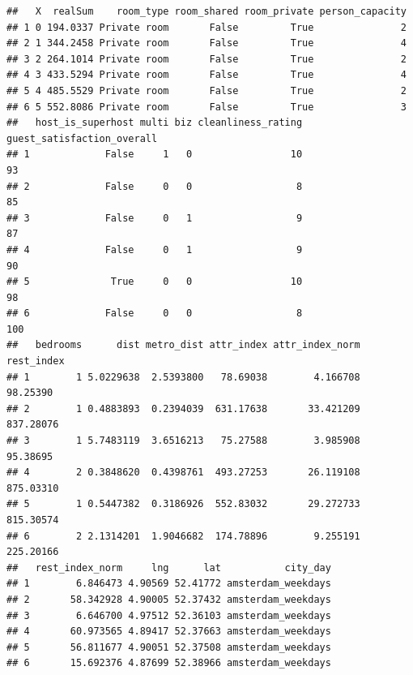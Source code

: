 \documentclass[
]{article}
\newenvironment{Shaded}{\begin{snugshade}}{\end{snugshade}}
\newcommand{\CommentTok}[1]{\textcolor[rgb]{0.56,0.35,0.01}{\textit{#1}}}
\newcommand{\FunctionTok}[1]{\textcolor[rgb]{0.00,0.00,0.00}{#1}}
\newcommand{\NormalTok}[1]{#1}
\newcommand{\SpecialCharTok}[1]{\textcolor[rgb]{0.00,0.00,0.00}{#1}}
\begin{document}
\begin{verbatim}
##   X  realSum    room_type room_shared room_private person_capacity
## 1 0 194.0337 Private room       False         True               2
## 2 1 344.2458 Private room       False         True               4
## 3 2 264.1014 Private room       False         True               2
## 4 3 433.5294 Private room       False         True               4
## 5 4 485.5529 Private room       False         True               2
## 6 5 552.8086 Private room       False         True               3
##   host_is_superhost multi biz cleanliness_rating guest_satisfaction_overall
## 1             False     1   0                 10                         93
## 2             False     0   0                  8                         85
## 3             False     0   1                  9                         87
## 4             False     0   1                  9                         90
## 5              True     0   0                 10                         98
## 6             False     0   0                  8                        100
##   bedrooms      dist metro_dist attr_index attr_index_norm rest_index
## 1        1 5.0229638  2.5393800   78.69038        4.166708   98.25390
## 2        1 0.4883893  0.2394039  631.17638       33.421209  837.28076
## 3        1 5.7483119  3.6516213   75.27588        3.985908   95.38695
## 4        2 0.3848620  0.4398761  493.27253       26.119108  875.03310
## 5        1 0.5447382  0.3186926  552.83032       29.272733  815.30574
## 6        2 2.1314201  1.9046682  174.78896        9.255191  225.20166
##   rest_index_norm     lng      lat           city_day
## 1        6.846473 4.90569 52.41772 amsterdam_weekdays
## 2       58.342928 4.90005 52.37432 amsterdam_weekdays
## 3        6.646700 4.97512 52.36103 amsterdam_weekdays
## 4       60.973565 4.89417 52.37663 amsterdam_weekdays
## 5       56.811677 4.90051 52.37508 amsterdam_weekdays
## 6       15.692376 4.87699 52.38966 amsterdam_weekdays
\end{verbatim}

\begin{Shaded}
\end{Shaded}
\end{document}
